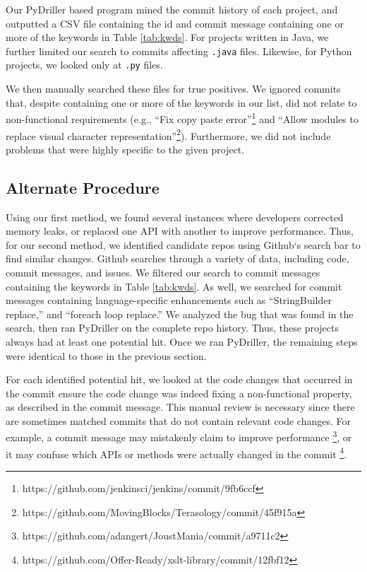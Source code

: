 \documentclass[sigconf]{acmart}
\begin{document}
Our PyDriller based program mined the commit history of each project, and outputted a CSV file containing the id and commit message containing one or more of the keywords in Table \ref{tab:kwds}. For projects written in Java, we further limited our search to commits affecting \texttt{.java} files. Likewise, for Python projects, we looked only at \texttt{.py} files.

We then manually searched these files for true positives. We ignored commits that, despite containing one or more of the keywords in our list, did not relate to non-functional requirements (e.g., ``Fix copy paste error''\footnote{https://github.com/jenkinsci/jenkins/commit/9fb6ccf} and ``Allow modules to replace visual character representation''\footnote{https://github.com/MovingBlocks/Terasology/commit/45f915a}). Furthermore, we did not include problems that were highly specific to the given project. 


\subsection{Alternate Procedure}
Using our first method, we found several instances where developers corrected memory leaks, or replaced one API with another to improve performance. Thus, for our second method, we identified candidate repos using Github`s search bar to find similar changes. Github searches through a variety of data, including code, commit messages, and issues. We filtered our search to commit messages containing the keywords in Table \ref{tab:kwds}. As well, we searched for commit messages containing language-specific enhancements such as ``StringBuilder replace,'' and ``foreach loop replace.'' We analyzed the bug that was found in the search, then ran PyDriller on the complete repo history. Thus, these projects always had at least one potential hit. Once we ran PyDriller, the remaining steps were identical to those in the previous section.

For each identified potential hit, we looked at the code changes that occurred in the commit ensure the code change was indeed fixing a non-functional property, as described in the commit message. This manual review is necessary since there are sometimes matched commits that do not contain relevant code changes. For example, a commit message may mistakenly claim to improve performance \footnote{https://github.com/adangert/JoustMania/commit/a9711c2}, or it may confuse which APIs or methods were actually changed in the commit \footnote{https://github.com/Offer-Ready/xslt-library/commit/12fbf12}.
\end{document}
